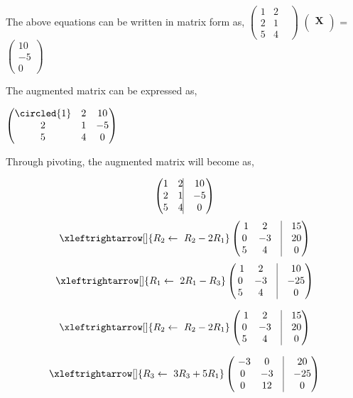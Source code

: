 \documentclass[journal,12pt,twocolumn]{article}
\let\vec\mathbf
\newcommand{\myvec}[1]{\ensuremath{\begin{pmatrix}#1\end{pmatrix}}}
\begin{document}
The above equations can be written in matrix form as,
\center
\myvec{ 1& 2 & \\ 2 & 1 & \\ 5 & 4 &} \myvec{\vec{X} \\} = \myvec{10\\-5\\0} \\
\vspace{0.3cm}
\begin{flushleft}
The augmented matrix can be expressed as,
\end{flushleft}
\myvec{ \circled{1} & 2 & 10 \\ 2 & 1  & -5 \\ 5 & 4   & 0} \\
\begin{flushleft}
Through pivoting, the augmented matrix will become as,
\end{flushleft}
\begin{align}
			    
			    \myvec{
				    1 & 2 \vrule & 10
			    \\
			    2 & 1  \vrule & -5
			    \\
			    5 & 4 \vrule & 0}
\end{align}
\begin{align}
 \xleftrightarrow[]{R_2 \leftarrow \ R_2-2R_1}
		\myvec{
    \ 1 & 2 & \vrule & 15
			    \\
0 & -3  &\vrule & 20
\\
5 & 4  &\vrule & 0
		    }
\end{align}
\begin{align}
 			\xleftrightarrow[]{R_1 \leftarrow \ 2R_1-R_3}
			    \myvec{
				    \ 1 & 2&\vrule & 10
			    \\
			    0 & -3 &\vrule & -25
			    \\
			    5 & 4 &\vrule & 0
		    }
\end{align}

\begin{align}
  \xleftrightarrow[]{R_2 \leftarrow \ R_2-2R_1}
                \myvec{
	\ 1 & 2 & \vrule & 15
                             \\
 0 & -3  &\vrule & 20
 \\
 5 & 4  &\vrule & 0
                     }
 \end{align}



\begin{align}
 			\xleftrightarrow[]{R_3 \leftarrow \ 3R_3+5R_1}
			    \myvec{
				    \ -3 & 0&\vrule & 20
			    \\
			    0 & -3 &\vrule & -25
			    \\
			    0 & 12 &\vrule & 0
		    }
\end{align}
\end{document}
